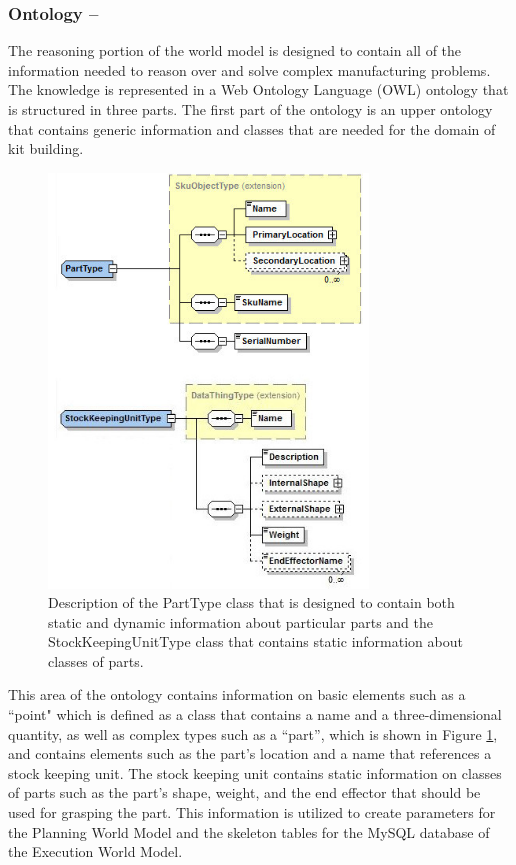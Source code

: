 \subsubsection{Ontology --}
\label{sect:Ontology}
The reasoning portion of the world model is designed to contain all of the information needed to reason over and solve complex manufacturing
problems. The knowledge is represented in a Web Ontology Language (OWL) ontology that is structured in three parts. The first part of the ontology is an upper ontology
that contains generic information and classes that are needed for the domain of kit building. 
%
\begin{figure}[htb!]
\begin{center}
\includegraphics[width=8.5cm]{images/PartSKUV2.jpg}
\caption{Description of the PartType class that is designed to contain both static and dynamic information about particular parts and the StockKeepingUnitType class that contains static information about classes of parts.}
\label{fig:part}
\end{center}
\end{figure}
%
This area of the ontology contains information on basic elements such as a ``point" which is defined as a class that contains a name 
and a three-dimensional quantity, as well as complex types such as a ``part'', which is
shown in Figure \ref{fig:part}, and
contains elements such as the part's location and a name that references a stock keeping unit. The stock keeping unit contains static information on classes of parts such as the part's shape, weight, and the end effector that should be used for grasping the part. This information is utilized to create parameters for the Planning World
Model and the skeleton tables for the MySQL database of the Execution World Model.

